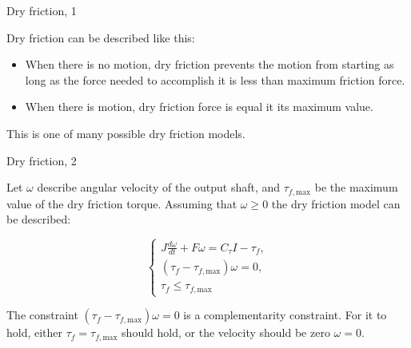 \documentclass{beamer}
\begin{document}
\begin{frame}{Dry friction, 1}
	\begin{flushleft}
		
		Dry friction can be described like this:
		
		\begin{itemize}
			\item When there is no motion, dry friction prevents the motion from starting as long as the force needed to accomplish it is less than maximum friction force.
			
			\item When there is motion, dry friction force is equal it its maximum value.
		\end{itemize}  
		
		This is one of many possible dry friction models.		
		
	\end{flushleft}
\end{frame}


\begin{frame}{Dry friction, 2}
	\begin{flushleft}
		
		Let $\omega$ describe angular velocity of the output shaft, and $\tau_{f, \text{max}}$ be the maximum value of the dry friction torque. Assuming that $\omega 
		\geq 0$ the dry friction model can be described:
		
		\begin{equation}
			\begin{cases}
				J \frac{d \omega}{dt} + F \omega = C_\tau I - \tau_f,  \\
				(\tau_f -  \tau_{f, \text{max}}) \omega = 0, \\
				\tau_f \leq \tau_{f, \text{max}}
			\end{cases}
		\end{equation}
		
		The constraint $(\tau_f -  \tau_{f, \text{max}}) \omega = 0$ is a complementarity constraint. For it to hold, either $\tau_f = \tau_{f, \text{max}}$ should hold, or the velocity should be zero $\omega = 0$.
		
	\end{flushleft}
\end{frame}
\end{document}

